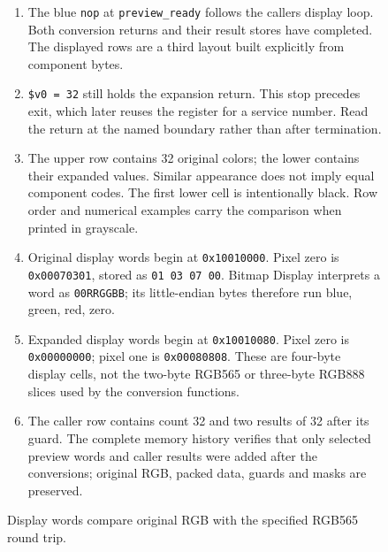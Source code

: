 \begin{figure}[htbp]
  \par\smallskip
  \begin{minipage}{\linewidth}
    \small
    \begin{enumerate}
      \setlength{\itemsep}{2pt}
            \setlength{\parsep}{0pt}
      \item The blue \texttt{nop} at \texttt{preview\_ready} follows the caller\textquotesingle s display loop. Both conversion returns and their result stores have completed. The displayed rows are a third layout built explicitly from component bytes.
      \item \texttt{\$v0 = 32} still holds the expansion return. This stop precedes exit, which later reuses the register for a service number. Read the return at the named boundary rather than after termination.
      \item The upper row contains 32 original colors; the lower contains their expanded values. Similar appearance does not imply equal component codes. The first lower cell is intentionally black. Row order and numerical examples carry the comparison when printed in grayscale.
      \item Original display words begin at \texttt{0x10010000}. Pixel zero is \texttt{0x00070301}, stored as \texttt{01 03 07 00}. Bitmap Display interprets a word as \texttt{00RRGGBB}; its little-endian bytes therefore run blue, green, red, zero.
      \item Expanded display words begin at \texttt{0x10010080}. Pixel zero is \texttt{0x00000000}; pixel one is \texttt{0x00080808}. These are four-byte display cells, not the two-byte RGB565 or three-byte RGB888 slices used by the conversion functions.
      \item The caller row contains count 32 and two results of 32 after its guard. The complete memory history verifies that only selected preview words and caller results were added after the conversions; original RGB, packed data, guards and masks are preserved.
    \end{enumerate}
  \end{minipage}
  \caption{Display words compare original RGB with the specified RGB565 round trip.}
  \label{capture:019-rgb-formats-f03}
  \label{rgb-f03}
\end{figure}
\par

